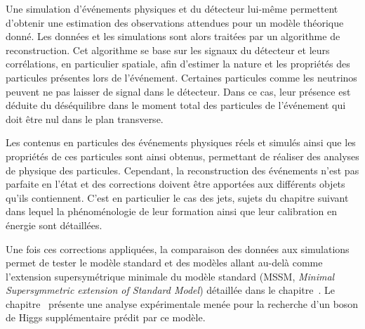 \par Une simulation d'événements physiques et du détecteur lui-même permettent d'obtenir une estimation des observations attendues pour un modèle théorique donné.
Les données et les simulations sont alors traitées par un algorithme de reconstruction.
Cet algorithme se base sur les signaux du détecteur et leurs corrélations, en particulier spatiale, afin d'estimer la nature et les propriétés des particules présentes lors de l'événement.
Certaines particules comme les neutrinos peuvent ne pas laisser de signal dans le détecteur.
Dans ce cas, leur présence est déduite du déséquilibre dans le moment total des particules de l'événement qui doit être nul dans le plan transverse.
\par Les contenus en particules des événements physiques réels et simulés ainsi que les propriétés de ces particules sont ainsi obtenus, permettant de réaliser des analyses de physique des particules.
Cependant, la reconstruction des événements n'est pas parfaite en l'état et des corrections doivent être apportées aux différents objets qu'ils contiennent.
C'est en particulier le cas des jets, sujets du chapitre suivant dans lequel la phénoménologie de leur formation ainsi que leur calibration en énergie sont détaillées.
\par Une fois ces corrections appliquées, la comparaison des données aux simulations permet de tester le modèle standard et des modèles allant au-delà comme l'extension supersymétrique minimale du modèle standard (MSSM, \emph{Minimal Supersymmetric extension of Standard Model}) détaillée dans le chapitre~.
Le chapitre~ présente une analyse expérimentale menée pour la recherche d'un boson de Higgs supplémentaire prédit par ce modèle.